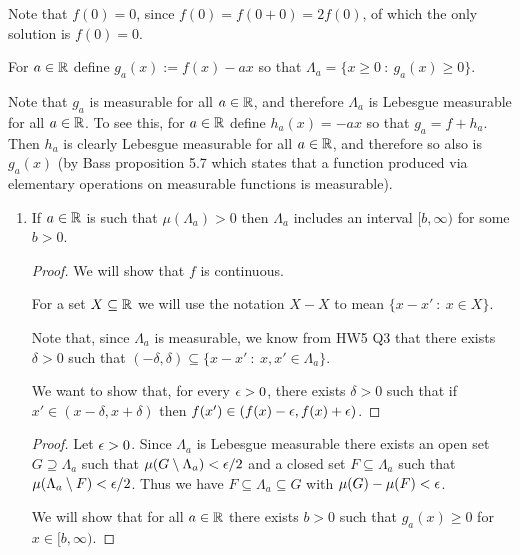 Note that $f(0) = 0$, since $f(0) = f(0 + 0) = 2f(0)$, of which the only solution is $f(0) = 0$.

For $a \in \mathbb{R}$ define $g_a(x) := f(x) - ax$ so that $\Lambda_a = \{x \geq 0 ~:~ g_a(x) \geq 0\}$.

Note that $g_a$ is measurable for all $a \in \mathbb{R}$, and therefore $\Lambda_a$ is Lebesgue measurable for
all $a \in \mathbb{R}$. To see this, for $a \in \mathbb{R}$ define $h_a(x) = -ax$ so that $g_a = f + h_a$. Then $h_a$ is
clearly Lebesgue measurable for all $a \in \mathbb{R}$, and therefore so also is $g_a(x)$ (by Bass proposition 5.7
which states that a function produced via elementary operations on measurable functions is measurable).

\begin{enumerate}
\item
  \begin{claim*}
    If $a \in \mathbb{R}$ is such that $\mu(\Lambda_a) > 0$ then $\Lambda_a$ includes an interval $[b, \infty)$ for some $b > 0$.
  \end{claim*}


  \begin{proof}
    We will show that $f$ is continuous.






    For a set $X \subseteq \mathbb{R}$ we will use the notation $X - X$ to mean $\{x - x' ~:~ x \in X \}$.

    Note that, since $\Lambda_a$ is measurable, we know from HW5 Q3 that there exists $\delta > 0$ such
    that $(-\delta, \delta) \subseteq \{x - x' ~:~ x, x' \in \Lambda_a \}$.

    We want to show that, for every $\epsilon > 0$, there exists $\delta > 0$ such that
    if $x' \in (x - \delta, x + \delta)$ then $f(x') \in (f(x) - \epsilon, f(x) + \epsilon)$.


  \end{proof}


  \begin{proof}
    Let $\epsilon > 0$. Since $\Lambda_a$ is Lebesgue measurable there exists an open set $G \supseteq \Lambda_a$
    such that $\mu(G \setminus \Lambda_a) < \epsilon/2$ and a closed set $F \subseteq \Lambda_a$ such
    that $\mu(\Lambda_a \setminus F) < \epsilon/2$. Thus we have $F \subseteq \Lambda_a \subseteq G$
    with $\mu(G) - \mu(F) < \epsilon$.

    We will show that for all $a \in \mathbb{R}$ there exists $b > 0$ such that $g_a(x) \geq 0$ for $x \in [b, \infty)$.


\end{proof}
\end{enumerate}
